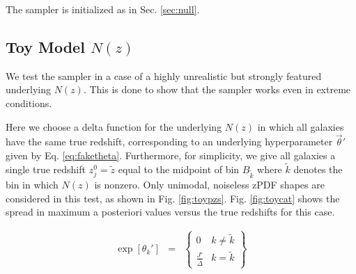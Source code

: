 \documentclass[preprint]{aastex}
\begin{document}
The sampler is initialized as in Sec. \ref{sec:null}.

%
%
%

\clearpage
\subsection{Toy Model $N(z)$}
\label{sec:fake}

We test the sampler in a case of a highly unrealistic but strongly featured underlying $N(z)$.  This is done to show that the sampler works even in extreme conditions.

Here we choose a delta function for the underlying $N(z)$ in which all galaxies have the same true redshift, corresponding to an underlying hyperparameter $\vec{\theta}'$ given by Eq. \ref{eq:faketheta}.  Furthermore, for simplicity, we give all galaxies a single true redshift $z_{j}^{0}=\tilde{z}$ equal to the midpoint of bin $B_{\tilde{k}}$ where $\tilde{k}$ denotes the bin in which $N(z)$ is nonzero.  Only unimodal, noiseless zPDF shapes are considered in this test, as shown in Fig. \ref{fig:toypzs}.  Fig. \ref{fig:toycat} shows the spread in maximum a posteriori values versus the true redshifts for this case.

\begin{eqnarray}
\label{eq:faketheta}
\exp[\theta_{k}'] &=& \left\{\begin{array}{cc}0&k\neq\tilde{k}\\ \frac{J'}{\bar{\Delta}}&k=\tilde{k}\end{array}\right\}
\end{eqnarray}
\end{document}
